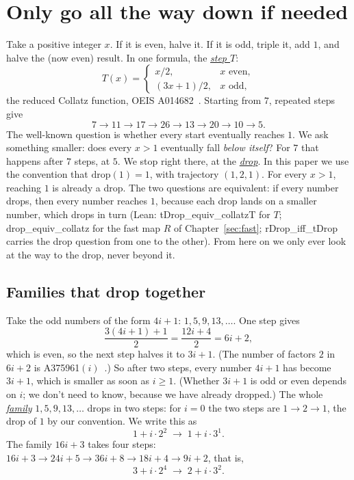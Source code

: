 \documentclass[10pt,a4paper,titlepage]{article}
\makeatletter
\newcommand{\termhere}[1]{\leavevmode
  \Hy@raisedlink{\hyper@anchorstart{term:#1}\hyper@anchorend}}
\newcommand{\keyterm}[2]{\hyperlink{box:#1}{\emph{#2}}}
\newcommand{\lean}[1]{\textsf{#1}}
\makeatother
\begin{document}
\section{Only go all the way down if needed}
\label{sec:intro}

\termhere{stepT}Take a positive integer $x$. If it is even, halve it. If it is odd, triple it,
add $1$, and halve the (now even) result. In one formula, the \keyterm{stepT}{step $T$}:
\[
T(x) = \begin{cases} x/2, & x \text{ even},\\ (3x+1)/2, & x \text{ odd}, \end{cases}
\]
the reduced Collatz function, OEIS A014682~\cite{OEIS_A014682}.
Starting from $7$, repeated steps give
\[
7 \to 11 \to 17 \to 26 \to 13 \to 20 \to 10 \to 5 .
\]
The well-known question is whether every start eventually reaches $1$. \termhere{drop}We ask
something smaller: does every $x > 1$ eventually fall \emph{below itself}? For
$7$ that happens after $7$ steps, at $5$. We stop right there, at the
\keyterm{drop}{drop}. In this paper we use the convention that $\mathrm{drop}(1) = 1$,
with trajectory $(1, 2, 1)$. For every $x > 1$, reaching $1$ is already a drop.
The two questions are equivalent: if every number drops, then every number
reaches $1$, because each drop lands on a smaller number, which drops in turn
(Lean: \lean{tDrop\_equiv\_collatzT} for $T$; \lean{drop\_equiv\_collatz} for the fast
map $R$ of Chapter~\ref{sec:fast}; \lean{rDrop\_iff\_tDrop} carries the drop question
from one to the other). From here on we only ever look at the way
to the drop, never beyond it.

\subsection*{Families that drop together}

\termhere{family}Take the odd numbers of the form $4i+1$: $1, 5, 9, 13, \dots$. One step gives
\[
\frac{3(4i+1)+1}{2} = \frac{12i+4}{2} = 6i+2,
\]
which is even, so the next step halves it to $3i+1$. (The number of factors $2$ in $6i+2$ is
A375961$(i)$~\cite{OEIS_A375961}.) So after two steps,
every number $4i+1$ has become $3i+1$, which is smaller as soon as $i \ge 1$.
(Whether $3i+1$ is odd or even depends on $i$; we don't need to know, because
we have already dropped.) The whole \keyterm{family}{family} $1, 5, 9, 13, \dots$ drops in two
steps: for $i = 0$ the two steps are $1 \to 2 \to 1$, the drop of $1$ by our
convention. We write this as
\[
1 + i\cdot 2^2 \;\to\; 1 + i\cdot 3^1 .
\]
The family $16i+3$ takes four steps:
$16i+3 \to 24i+5 \to 36i+8 \to 18i+4 \to 9i+2$, that is,
\[
3 + i\cdot 2^4 \;\to\; 2 + i\cdot 3^2 .
\]
\end{document}
